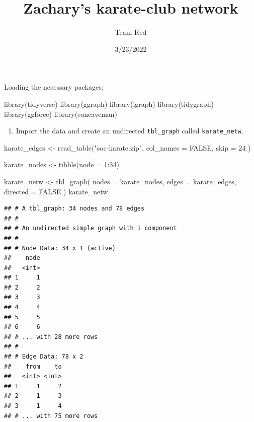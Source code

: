 \documentclass[
]{article}
\title{Zachary's karate-club network}
\author{Team Red}
\date{3/23/2022}
\newenvironment{Shaded}{\begin{snugshade}}{\end{snugshade}}
\newcommand{\AttributeTok}[1]{\textcolor[rgb]{0.77,0.63,0.00}{#1}}
\newcommand{\ConstantTok}[1]{\textcolor[rgb]{0.00,0.00,0.00}{#1}}
\newcommand{\DecValTok}[1]{\textcolor[rgb]{0.00,0.00,0.81}{#1}}
\newcommand{\FunctionTok}[1]{\textcolor[rgb]{0.00,0.00,0.00}{#1}}
\newcommand{\NormalTok}[1]{#1}
\newcommand{\OtherTok}[1]{\textcolor[rgb]{0.56,0.35,0.01}{#1}}
\newcommand{\SpecialCharTok}[1]{\textcolor[rgb]{0.00,0.00,0.00}{#1}}
\newcommand{\StringTok}[1]{\textcolor[rgb]{0.31,0.60,0.02}{#1}}
\providecommand{\tightlist}{%
  \setlength{\itemsep}{0pt}\setlength{\parskip}{0pt}}
\begin{document}
\maketitle

Loading the necessary packages:

\begin{Shaded}
\begin{Highlighting}[]
\FunctionTok{library}\NormalTok{(tidyverse)}
\FunctionTok{library}\NormalTok{(ggraph)}
\FunctionTok{library}\NormalTok{(igraph)}
\FunctionTok{library}\NormalTok{(tidygraph)}
\FunctionTok{library}\NormalTok{(ggforce)}
\FunctionTok{library}\NormalTok{(concaveman)}
\end{Highlighting}
\end{Shaded}

\begin{enumerate}
\def\labelenumi{(\arabic{enumi})}
\tightlist
\item
  Import the data and create an undirected \texttt{tbl\_graph} called
  \texttt{karate\_netw}.
\end{enumerate}

\begin{Shaded}
\begin{Highlighting}[]
\NormalTok{karate\_edges }\OtherTok{\textless{}{-}} \FunctionTok{read\_table}\NormalTok{(}\StringTok{"soc{-}karate.zip"}\NormalTok{,}
  \AttributeTok{col\_names =} \ConstantTok{FALSE}\NormalTok{, }\AttributeTok{skip =} \DecValTok{24}
\NormalTok{)}

\NormalTok{karate\_nodes }\OtherTok{\textless{}{-}} \FunctionTok{tibble}\NormalTok{(}\AttributeTok{node =} \DecValTok{1}\SpecialCharTok{:}\DecValTok{34}\NormalTok{)}

\NormalTok{karate\_netw }\OtherTok{\textless{}{-}} \FunctionTok{tbl\_graph}\NormalTok{(}
  \AttributeTok{nodes =}\NormalTok{ karate\_nodes,}
  \AttributeTok{edges =}\NormalTok{ karate\_edges,}
  \AttributeTok{directed =} \ConstantTok{FALSE}
\NormalTok{)}
\NormalTok{karate\_netw}
\end{Highlighting}
\end{Shaded}

\begin{verbatim}
## # A tbl_graph: 34 nodes and 78 edges
## #
## # An undirected simple graph with 1 component
## #
## # Node Data: 34 x 1 (active)
##    node
##   <int>
## 1     1
## 2     2
## 3     3
## 4     4
## 5     5
## 6     6
## # ... with 28 more rows
## #
## # Edge Data: 78 x 2
##    from    to
##   <int> <int>
## 1     1     2
## 2     1     3
## 3     1     4
## # ... with 75 more rows
\end{verbatim}
\end{document}
